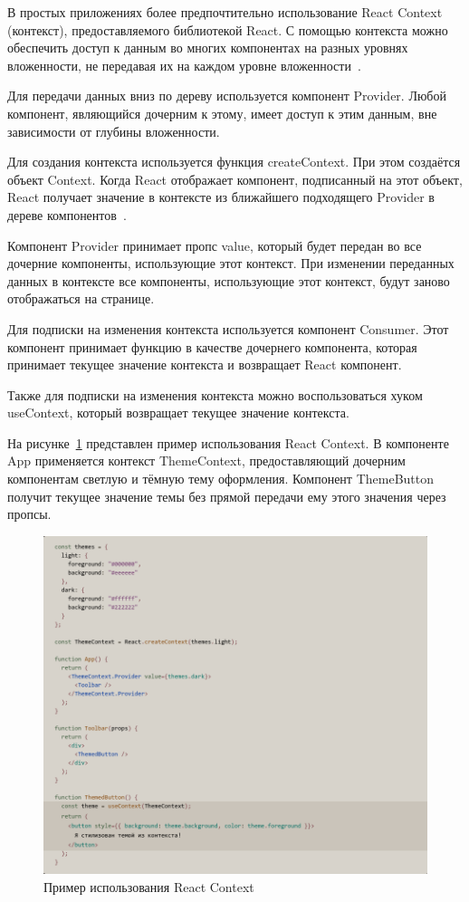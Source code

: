 В простых приложениях более предпочтительно использование React Context (контекст), предоставляемого библиотекой React. С помощью контекста можно обеспечить доступ к данным во многих компонентах на разных уровнях вложенности, не передавая их на каждом уровне вложенности~\cite{react}.

Для передачи данных вниз по дереву используется компонент Provider. Любой компонент, являющийся дочерним к этому, имеет доступ к этим данным, вне зависимости от глубины вложенности.

Для создания контекста используется функция createContext. При этом создаётся объект Context. Когда React отображает компонент, подписанный на этот объект, React получает значение в контексте из ближайшего подходящего Provider в дереве компонентов~\cite{react}.

Компонент Provider принимает пропс value, который будет передан во все дочерние компоненты, использующие этот контекст. При изменении переданных данных в контексте все компоненты, использующие этот контекст, будут заново отображаться на странице.

Для подписки на изменения контекста используется компонент Consumer. Этот компонент принимает функцию в качестве дочернего компонента, которая принимает текущее значение контекста и возвращает React компонент.

Также для подписки на изменения контекста можно воспользоваться хуком useContext, который возвращает текущее значение контекста.

На рисунке~\ref{img:react__context} представлен пример использования React Context. В компоненте App применяется контекст ThemeContext, предоставляющий дочерним компонентам светлую и тёмную тему оформления. Компонент ThemeButton получит текущее значение темы без прямой передачи ему этого значения через пропсы.

\begin{figure}[H]
  \centering
  \includegraphics[height=0.4\textheight]{assets/images/theoretical2/react_context.png}
  \caption{Пример использования React Context}
  \label{img:react__context}
\end{figure}

